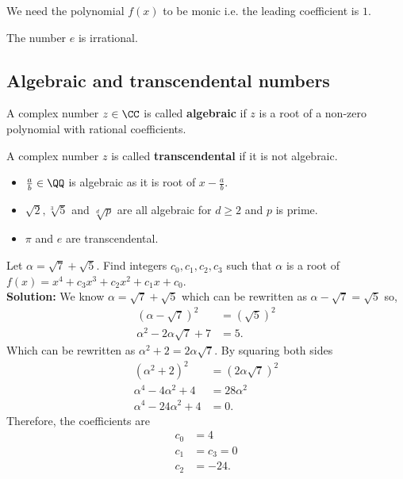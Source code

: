 \documentclass[12pt, a4paper]{article}
\begin{document}
\begin{mdremark}
    We need the polynomial \(f(x)\) to be monic i.e. the leading coefficient is \(1\).
\end{mdremark}

\begin{theorem}
    The number \(e\) is irrational.
\end{theorem}

\subsection{Algebraic and transcendental numbers}

\begin{definition}
    A complex number \(z \in \CC\) is called \textbf{algebraic} if \(z\) is a root of a non-zero polynomial with rational coefficients.
\end{definition}

\begin{definition}
    A complex number \(z\) is called \textbf{transcendental} if it is not algebraic.
\end{definition}

\begin{example}
    \hphantom{SPACE}
    \begin{itemize}
        \item \(\frac{a}{b} \in \QQ\) is algebraic as it is root of \(x-\frac{a}{b}\).
        \item \(\sqrt{2}, \sqrt[3]{5}\) and \(\sqrt[d]{p}\) are all algebraic for \(d\geq 2\) and \(p\) is prime.
        \item \(\pi\) and \(e\) are transcendental.
    \end{itemize}
\end{example}

\begin{mdexample}
    Let \(\alpha = \sqrt{7}+\sqrt{5}\). Find integers \(c_0,c_1,c_2,c_3\) such that \(\alpha\) is a root of \(f(x)=x^4+c_3 x^3+c_2 x^2 +c_1 x+c_0\). \\
    \textbf{Solution:} We know \(\alpha =\sqrt{7} + \sqrt{5}\) which can be rewritten as \(\alpha -\sqrt{7} = \sqrt{5}\) so,
    \[\begin{aligned}
        (\alpha -\sqrt{7})^2 &= (\sqrt{5})^2 \\
        \alpha^2 -2\alpha\sqrt{7} +7 &= 5.
    \end{aligned}\]
    Which can be rewritten as \(\alpha^2+2 = 2\alpha\sqrt{7}\). By squaring both sides
    \[\begin{aligned}
        (\alpha^2+2)^2 &= (2\alpha\sqrt{7})^2 \\
        \alpha^4 - 4\alpha^2+4 &= 28\alpha^2 \\
        \alpha^4 -24\alpha^2+ 4 &=0.
    \end{aligned}\]
    Therefore, the coefficients are
    \[\begin{aligned}
        c_0 &= 4 \\ 
        c_1 &= c_3 = 0 \\
        c_2 &= -24.
    \end{aligned}\]
\end{mdexample}
\end{document}
